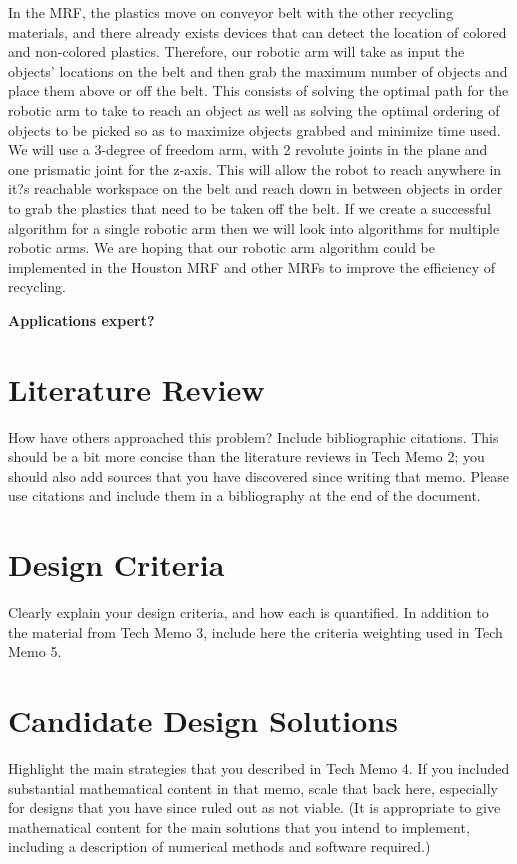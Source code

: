 \documentclass [11pt ]{ report}
\renewcommand{\b}{\textbf}
\begin{document}
In the MRF, the plastics move on conveyor belt with the other recycling materials, and there already exists devices that can detect the location of colored and non-colored plastics. Therefore, our robotic arm will take as input the objects' locations on the belt and then grab the maximum number of objects and place them above or off the belt. This consists of solving the optimal path for the robotic arm to take to reach an object as well as solving the optimal ordering of objects to be picked so as to maximize objects grabbed and minimize time used. We will use a 3-degree of freedom arm, with 2 revolute joints in the plane and one prismatic joint for the z-axis. This will allow the robot to reach anywhere in it?s reachable workspace on the belt and reach down in between objects in order to grab the plastics that need to be taken off the belt. If we create a successful algorithm for a single robotic arm then we will look into algorithms for multiple robotic arms. We are hoping that our robotic arm algorithm could be implemented in the Houston MRF and other MRFs to improve the efficiency of recycling.


\b{Applications expert?}


\section{Literature Review}
How have others approached this problem? Include bibliographic citations.
This should be a bit more concise than the literature reviews in Tech Memo 2; you
should also add sources that you have discovered since writing that memo. Please use citations
and include them in a bibliography at the end of the document.

\section{Design Criteria}
Clearly explain your design criteria, and how each is quantified. In addition
to the material from Tech Memo 3, include here the criteria weighting used in Tech Memo 5.

\section{Candidate Design Solutions}
Highlight the main strategies that you described in Tech Memo 4.
If you included substantial mathematical content in that memo, scale that back here, especially
for designs that you have since ruled out as not viable. (It is appropriate to give mathematical
content for the main solutions that you intend to implement, including a description
of numerical methods and software required.)
\end{document}
